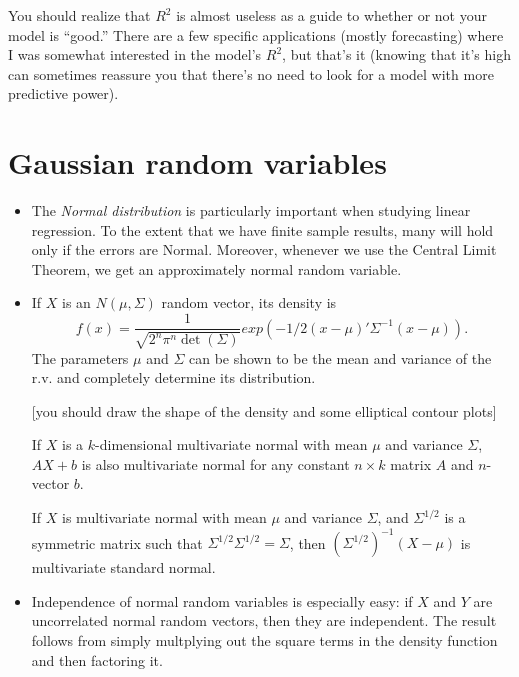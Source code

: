 \begin{itemize}[leftmargin=0pt]
  You should realize that $R^2$ is almost useless as a guide to whether
  or not your model is ``good.''  There are a few specific
  applications (mostly forecasting) where I was somewhat interested in
  the model's $R^2$, but that's it (knowing that it's high can
  sometimes reassure you that there's no need to look for a model with
  more predictive power).

\end{itemize}

\section{Gaussian random variables}

\begin{itemize}[leftmargin=0pt]

\item The \emph{Normal distribution} is particularly important when
  studying linear regression.  To the extent that we have finite
  sample results, many will hold only if the errors are Normal.
  Moreover, whenever we use the Central Limit Theorem, we get an
  approximately normal random variable.

\item If $X$ is an $N(\mu, \Sigma)$ random vector, its density is
  \begin{equation*}
    f(x) = \frac{1}{\sqrt{2^n \pi^n \det(\Sigma)}} exp(-1/2(x - \mu)'\Sigma^{-1}(x- \mu)).
  \end{equation*}
  The parameters $\mu$ and $\Sigma$ can be shown to be the mean and variance
  of the r.v. and completely determine its distribution.

  [you should draw the shape of the density and some elliptical
  contour plots]

  If $X$ is a $k$-dimensional multivariate normal with mean $\mu$
  and variance $\Sigma$, $A X + b$ is also multivariate normal for any
  constant $n \times k$ matrix $A$ and $n$-vector $b$.

  If $X$ is multivariate normal with mean $\mu$ and variance $\Sigma$,
  and $\Sigma^{1/2}$ is a symmetric matrix such that $\Sigma^{1/2} \Sigma^{1/2} = \Sigma$,
  then $(\Sigma^{1/2})^{-1} (X - \mu)$ is multivariate standard normal.

\item Independence of normal random variables is especially easy: if
  $X$ and $Y$ are uncorrelated normal random vectors, then they are
  independent.  The result follows from simply multplying out the
  square terms in the density function and then factoring it.


\end{itemize}
